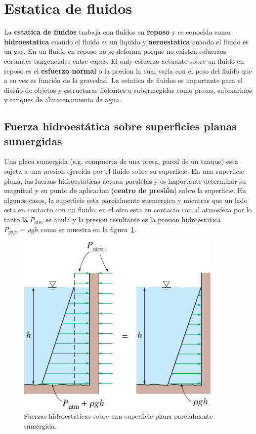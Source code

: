 \documentclass[10pt, oneside]{article}
\begin{document}
\section{Estatica de fluidos}
La \textbf{estatica de fluidos} trabaja con fluidos en \textbf{reposo} y es conocida como \textbf{hidroestatica} cuando el fluido es un liquido y \textbf{aeroestatica} cuando el fluido es un gas. En un fluido en reposo no se deforma porque no existen esfuerzos cortantes tangenciales entre capas. El only esfuerzo actuante sobre un fluido en reposo es el \textbf{esfuerzo normal} o la presion la cual varia con el peso del fluido que a su vez es funci\'on de la gravedad. La estatica de fluidos es importante para el dise\~no de objetos y estructuras flotantes o subermegidas como presas, submarinos y tanques de almacenamiento de agua.
\subsection{Fuerza hidroest\'atica sobre superficies planas sumergidas}
\label{hipl}
Una placa sumergida (e.g. compuerta de una presa, pared de un tanque) esta sujeta a una presion ejercida por el fluido sobre su superficie. En una superficie plana, las fuerzas hidroestaticas actuan paralelas y es importante determinar su magnitud y su punto de aplicacion (\textbf{centro de presi\'on}) sobre la superficie. En algunos casos, la superficie esta parcialmente suemergica y mientras que un lado esta en contacto con un fluido, en el otro esta en contacto con al atmosfera por lo tanto la $P_{atm}$ se anula y la presion resultante es la presion hidroestatica $P_{gage}=\rho g h$ como se muestra en la figura~\ref{hes1}.

\begin{figure}[h]
\centering
\includegraphics[width=10cm]{hes1}
\caption{Fuerzas hidroestaticas sobre una superficie plana parcialmente sumergida.}
\label{hes1}
\end{figure}
\end{document}
